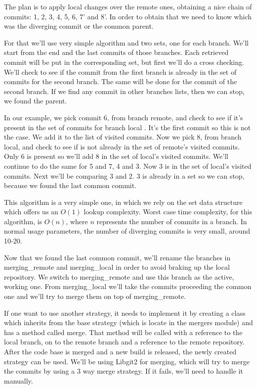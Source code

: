 The plan is to apply local changes over the remote ones, obtaining a nice chain of commits: 1, 2, 3, 4, 5, 6, 7' and 8'. In order to obtain that we need to know which was the diverging commit or the common parent. 

For that we'll use very simple algorithm and two sets, one for each branch. We'll start from the end and the last commits of those branches. Each retrieved commit will be put in the corresponding set, but first we'll do a cross checking. We'll check to see if the commit from the first branch is already in the set of commits for the second branch. The same will be done for the commit of the second branch. If we find any commit in other branches lists, then we can stop, we found the parent.

In our example, we pick commit 6, from branch remote, and check to see if it's present in the set of commits for branch local . It's the first commit so this is not the case. We add it to the list of visited commits. Now we pick 8, from branch local, and check to see if is not already in the set of remote's  visited commits.
Only 6 is present so we'll add 8 in the set of local's visited commits. We'll continue to do the same for 5 and 7, 4 and 3. Now 3 is in the set of local's visited commits. Next we'll be comparing 3 and 2. 3 is already in a set so we can stop, because we found the last common commit.

This algorithm is a very simple one, in which we rely on the set data structure which offers us an $O(1)$ lookup complexity. Worst case time complexity, for this algorithm, is $O(n)$, where $n$ represents the number of commits in a branch. In normal usage parameters, the number of diverging commits is very small, around 10-20.

Now that we found the last common commit, we'll rename the branches in merging\_remote and merging\_local in order to avoid braking up the local repository. We switch to merging\_remote and use this branch as the active, working one. From merging\_local we'll take the commits proceeding the common one and we'll try to merge them on top of merging\_remote. 

If one want to use another strategy, it needs to implement it by creating a class which inherits from the base strategy (which is locate in the mergers module) and has a method called merge. That method will be called with a reference to the local branch, on to the remote branch and a reference to the remote repository. After the code base is merged and a new build is released, the newly created strategy can be used. We'll be using Libgit2 for merging, which will try to merge the commits by using a 3 way merge strategy. If it fails, we'll need to handle it manually.

